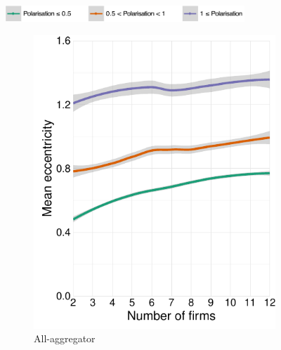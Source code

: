 \documentclass[preprint, 12pt]{elsarticle}
\begin{document}
\begin{figure}[ht!]
	\centering
	\caption{Mean eccentricity where $\mu \in [0, 1.5]$ and $n_l/n_r \in [1, 2]$.}
	\includegraphics[width=90mm]{Graphics/legend_pol.pdf}

	\begin{subfigure}[t]{0.315\textwidth}
		\includegraphics[width=\textwidth, trim={8mm 0 0 0}]{Graphics/fig331a_tall.pdf}
		\caption{All-aggregator}
		\label{fig:eccentricity_aggregator}
	\end{subfigure}
	~
	\begin{subfigure}[t]{0.315\textwidth}

\end{subfigure}
\end{figure}
\end{document}
